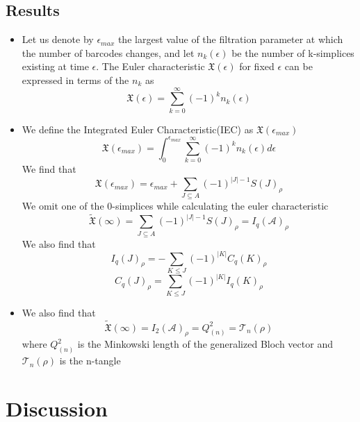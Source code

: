 \subsection{Results}
\begin{itemize}
    \item Let us denote by $\epsilon_{max}$ the largest value of the filtration parameter at which the number
of barcodes changes, and let $n_k(\epsilon)$ be the number of k-simplices existing at time $\epsilon$. The Euler
characteristic $\mathfrak{X}(\epsilon)$ for fixed $\epsilon$ can be expressed in terms of the $n_k$ as 
\begin{equation}
    \mathfrak{X}(\epsilon) = \sum^{\infty}_{k=0} (-1)^kn_k(\epsilon)
\end{equation}
\item We define the Integrated Euler Characteristic(IEC) as $\mathfrak{X}(\epsilon_{max})$
\begin{equation}
    \mathfrak{X}(\epsilon_{max}) = \int_{0}^{\epsilon_{max}} \sum^{\infty}_{k=0} (-1)^k n_k(\epsilon)d\epsilon
\end{equation}
We find that 
\begin{equation}
    \mathfrak{X}(\epsilon_{max}) = \epsilon_{max} + \sum_{J \subseteq A} (-1)^{|J| - 1} S(J)_\rho
\end{equation}
We omit one of the 0-simplices while calculating the euler characteristic 
\begin{equation}
    \tilde{\mathfrak{X}}(\infty) = \sum_{J \subseteq A} (-1)^{|J| - 1} S(J)_\rho = I_q(\mathcal{A})_\rho
\end{equation}
We also find that 
\begin{equation}
    I_q(J)_\rho = - \sum_{K \leq J} (-1)^{|K|} C_q(K)_\rho
\end{equation}
\begin{equation}
    C_q(J)_\rho =  \sum_{K \leq J} (-1)^{|K|} I_q(K)_\rho
\end{equation}
\item We also find that 
\begin{equation}
    \tilde{\mathfrak{X}}(\infty) = I_2(\mathcal{A})_\rho = Q^2_{(n)} = \mathcal{T}_n(\rho)
\end{equation}
where $Q^2_{(n)}$ is the Minkowski
length of the generalized Bloch vector and $\mathcal{T}_n(\rho)$ is the n-tangle 

\end{itemize}
\section{Discussion}

